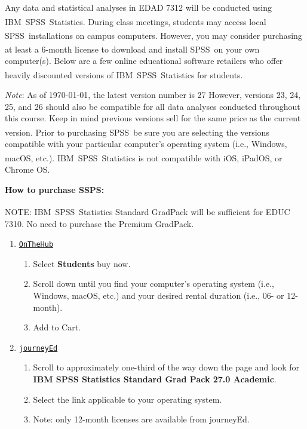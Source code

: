 \documentclass[
]{article}
\providecommand{\tightlist}{%
  \setlength{\itemsep}{0pt}\setlength{\parskip}{0pt}}
\begin{document}
Any data and statistical analyses in EDAD 7312 will be conducted using
IBM\textsuperscript{\textregistered}~SPSS\textsuperscript{\textregistered}~Statistics.
During class meetings, students may access local
SPSS\textsuperscript{\textregistered}~installations on campus computers.
However, you may consider purchasing at least a 6-month license to
download and install SPSS\textsuperscript{\textregistered}~on your own
computer(s). Below are a few online educational software retailers who
offer heavily discounted versions of
IBM\textsuperscript{\textregistered}~SPSS\textsuperscript{\textregistered}~Statistics
for students.

\emph{Note}: As of \today, the latest version number is 27 However,
versions 23, 24, 25, and 26 should also be compatible for all data
analyses conducted throughout this course. Keep in mind previous
versions sell for the same price as the current version. Prior to
purchasing SPSS\textsuperscript{\textregistered}~be sure you are
selecting the versions compatible with your particular computer's
operating system (i.e., Windows, macOS, etc.).
IBM\textsuperscript{\textregistered}~SPSS\textsuperscript{\textregistered}~Statistics
is not compatible with iOS, iPadOS, or Chrome OS.

\textbf{How to purchase SSPS:}

\begin{tcolorbox}
[width=\linewidth, sharp corners=all, colback=white!95!red]
NOTE: IBM\textsuperscript{\textregistered}\ SPSS\textsuperscript{\textregistered}\ Statistics Standard GradPack will be sufficient for EDUC 7310. No need to purchase the Premium GradPack.
\end{tcolorbox}

\begin{enumerate}
\def\labelenumi{\arabic{enumi}.}
\tightlist
\item
  \texttt{\href{https://onthehub.com/spss/}{OnTheHub}}

  \begin{enumerate}
  \def\labelenumii{\arabic{enumii}.}
  \tightlist
  \item
    Select \textbf{Students} buy now.
  \item
    Scroll down until you find your computer's operating system (i.e.,
    Windows, macOS, etc.) and your desired rental duration (i.e., 06- or
    12-month).
  \item
    Add to Cart.
  \end{enumerate}
\item
  \texttt{\href{https://www.journeyed.com/products/IBM+SPSS/IBM+SPSS+Statistics}{journeyEd}}

  \begin{enumerate}
  \def\labelenumii{\arabic{enumii}.}
  \tightlist
  \item
    Scroll to approximately one-third of the way down the page and look
    for \textbf{IBM SPSS Statistics Standard Grad Pack 27.0 Academic}.
  \item
    Select the link applicable to your operating system.
  \item
    Note: only 12-month licenses are available from journeyEd.
  \end{enumerate}
\end{enumerate}
\end{document}
